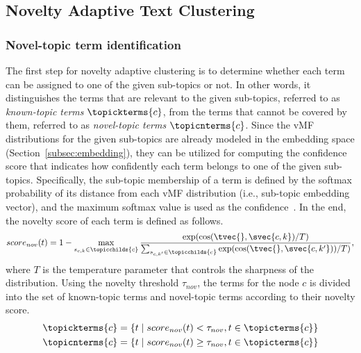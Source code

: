 
\subsection{Novelty Adaptive Text Clustering}
\label{subsec:clustering}
\subsubsection{Novel-topic term identification}
\label{subsubsec:novelty}
The first step for novelty adaptive clustering is to determine whether each term can be assigned to one of the given sub-topics or not.
In other words, it distinguishes the terms that are relevant to the given sub-topics, referred to as \textit{known-topic terms} $\topickterms{c}$, from the terms that cannot be covered by them, referred to as \textit{novel-topic terms} $\topicnterms{c}$.
Since the vMF distributions for the given sub-topics are already modeled in the embedding space (Section~\ref{subsec:embedding}), they can be utilized for computing the confidence score that indicates how confidently each term belongs to one of the given sub-topics.
Specifically, the sub-topic membership of a term is defined by the softmax probability of its distance from each vMF distribution (i.e., sub-topic embedding vector), and the maximum softmax value is used as the confidence~\cite{hendrycks2020pretrained, lee2020multi}.
In the end, the novelty score of each term is defined as follows.
\begin{equation}
\label{eq:novscore}
    score_{nov}(t) = 1 - \max_{s_{c,k}\in\topicchilds{c}} \frac{\exp( \cos(\tvec{}, \svec{c,k})/T)} {\sum_{s_{c,k'}\in\topicchilds{c}} \exp(\cos(\tvec{}, \svec{c,k'}))/T)},
\end{equation}
where $T$ is the temperature parameter that controls the sharpness of the distribution.
Using the novelty threshold $\tau_{nov}$, the terms for the node $c$ is divided into the set of known-topic terms and novel-topic terms according to their novelty score.
\begin{equation}
\begin{split}
    \topickterms{c} &= \left\{t \mid score_{nov}(t) < \tau_{nov}, t\in\topicterms{c}\right\} \\
    \topicnterms{c} &= \left\{t \mid score_{nov}(t) \geq \tau_{nov}, t\in\topicterms{c}\right\}
\end{split}
\end{equation}
 
